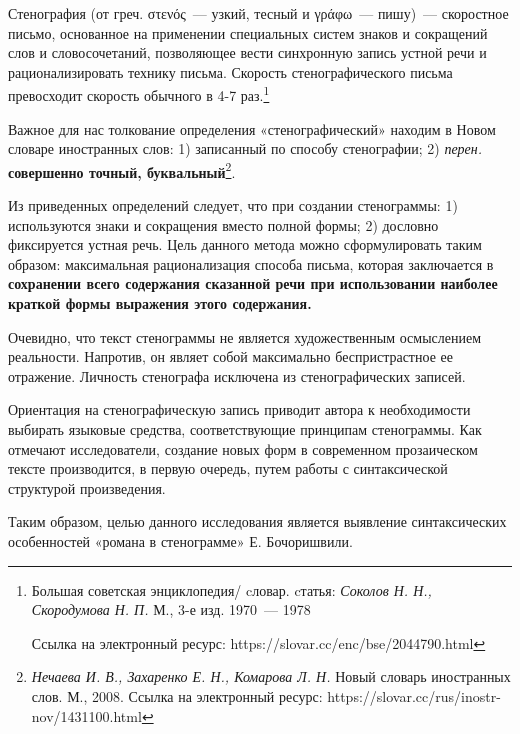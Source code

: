 \documentclass{kursa4}
\begin{document}
    {Стенография}\textbf{{ }}(от греч. στενός~--- узкий, тесный и γράφω~--- пишу)~--- скоростное письмо, основанное на применении специальных систем знаков и сокращений слов и словосочетаний, позволяющее вести синхронную запись устной речи и рационализировать технику письма. Скорость стенографического письма превосходит скорость обычного в 4-7 раз.\footnote{{Большая советская энциклопедия/ cловар. cтатья: \textit{Соколов Н. Н., Скородумова Н. П.} М., 3-е изд. 1970~--- 1978}\par{Ссылка на электронный ресурс: https://slovar.cc/enc/bse/2044790.html}}

    Важное для нас толкование определения «стенографический» находим в Новом словаре иностранных слов{: }1) записанный по способу стенографии; 2) \textit{перен.} \textbf{совершенно точный, буквальный}\footnote{\textit{{Нечаева И. В., Захаренко Е. Н., Комарова Л. Н. }}{Новый словарь иностранных слов. М., 2008. Ссылка на электронный ресурс:
    https://slovar.cc/rus/inostr-nov/1431100.html}}. 

    Из приведенных определений следует, что при создании стенограммы: 1) используются знаки и сокращения вместо полной формы; 2) дословно фиксируется устная речь. Цель данного метода можно сформулировать таким образом: максимальная рационализация способа письма, которая заключается в \textbf{сохранении всего содержания сказанной речи при использовании наиболее краткой формы выражения этого содержания.} 

    Очевидно, что текст стенограммы не является художественным осмыслением реальности. Напротив, он являет собой максимально беспристрастное ее отражение. Личность стенографа исключена из стенографических записей. 

    Ориентация на стенографическую запись приводит автора к необходимости выбирать языковые средства, соответствующие принципам стенограммы. Как отмечают исследователи, создание новых форм в современном прозаическом тексте производится, в первую очередь, путем работы с синтаксической структурой произведения. 

    

    {Таким образом, целью данного исследования является выявление синтаксических особенностей «романа в стенограмме» Е. Бочоришвили.}
\end{document}
